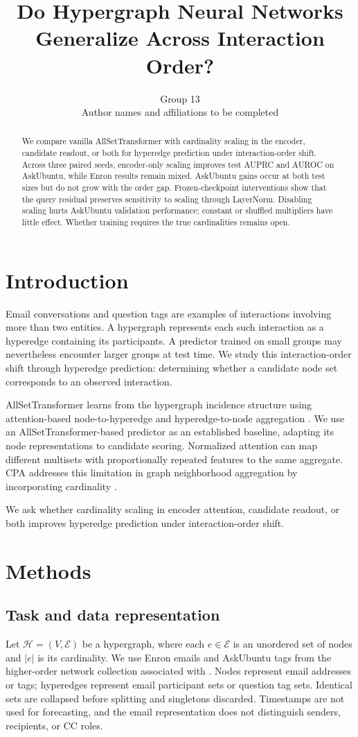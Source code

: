 \documentclass{article}
\title{Do Hypergraph Neural Networks Generalize Across Interaction Order?}
\author{Group 13\\Author names and affiliations to be completed}
\begin{document}
\maketitle
\begin{abstract}
We compare vanilla AllSetTransformer with cardinality scaling in the encoder, candidate readout, or both for hyperedge prediction under interaction-order shift. Across three paired seeds, encoder-only scaling improves test AUPRC and AUROC on AskUbuntu, while Enron results remain mixed. AskUbuntu gains occur at both test sizes but do not grow with the order gap. Frozen-checkpoint interventions show that the query residual preserves sensitivity to scaling through LayerNorm. Disabling scaling hurts AskUbuntu validation performance; constant or shuffled multipliers have little effect. Whether training requires the true cardinalities remains open.
\end{abstract}

\section{Introduction}
Email conversations and question tags are examples of interactions involving more than two entities. A hypergraph represents each such interaction as a hyperedge containing its participants. A predictor trained on small groups may nevertheless encounter larger groups at test time. We study this interaction-order shift through hyperedge prediction: determining whether a candidate node set corresponds to an observed interaction.

AllSetTransformer learns from the hypergraph incidence structure using attention-based node-to-hyperedge and hyperedge-to-node aggregation \citep{allset}. We use an AllSetTransformer-based predictor as an established baseline, adapting its node representations to candidate scoring. Normalized attention can map different multisets with proportionally repeated features to the same aggregate. CPA addresses this limitation in graph neighborhood aggregation by incorporating cardinality \citep{cpa}.

We ask whether cardinality scaling in encoder attention, candidate readout, or both improves hyperedge prediction under interaction-order shift.

\section{Methods}
\subsection{Task and data representation}
Let $\mathcal H=(V,\mathcal E)$ be a hypergraph, where each $e\in\mathcal E$ is an unordered set of nodes and $|e|$ is its cardinality. We use Enron emails and AskUbuntu tags from the higher-order network collection associated with \citet{benson}. Nodes represent email addresses or tags; hyperedges represent email participant sets or question tag sets. Identical sets are collapsed before splitting and singletons discarded. Timestamps are not used for forecasting, and the email representation does not distinguish senders, recipients, or CC roles.
\end{document}
